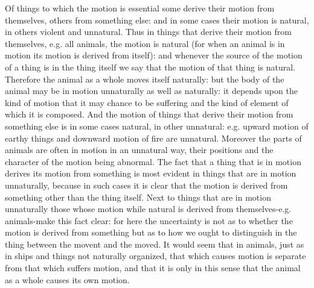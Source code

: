 Of things to which the motion is essential some derive their motion
from themselves, others from something else: and in some cases their
motion is natural, in others violent and unnatural. Thus in things
that derive their motion from themselves, e.g. all animals, the motion
is natural (for when an animal is in motion its motion is derived
from itself): and whenever the source of the motion of a thing is
in the thing itself we say that the motion of that thing is natural.
Therefore the animal as a whole moves itself naturally: but the body
of the animal may be in motion unnaturally as well as naturally: it
depends upon the kind of motion that it may chance to be suffering
and the kind of element of which it is composed. And the motion of
things that derive their motion from something else is in some cases
natural, in other unnatural: e.g. upward motion of earthy things and
downward motion of fire are unnatural. Moreover the parts of animals
are often in motion in an unnatural way, their positions and the character
of the motion being abnormal. The fact that a thing that is in motion
derives its motion from something is most evident in things that are
in motion unnaturally, because in such cases it is clear that the
motion is derived from something other than the thing itself. Next
to things that are in motion unnaturally those whose motion while
natural is derived from themselves-e.g. animals-make this fact clear:
for here the uncertainty is not as to whether the motion is derived
from something but as to how we ought to distinguish in the thing
between the movent and the moved. It would seem that in animals, just
as in ships and things not naturally organized, that which causes
motion is separate from that which suffers motion, and that it is
only in this sense that the animal as a whole causes its own motion.

